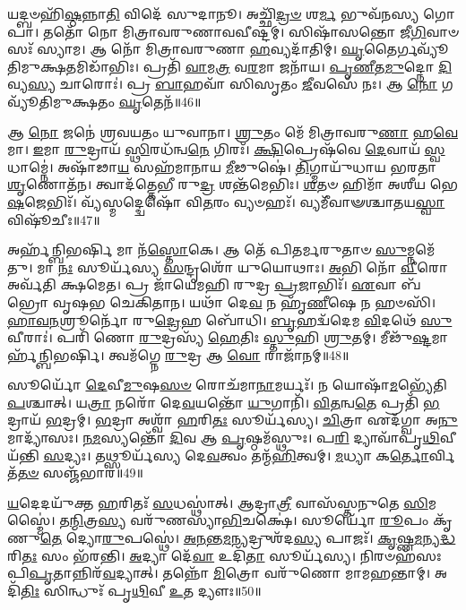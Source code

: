 𑌯𑌦𑍍𑌬𑍞𑌹𑌿᳴\-\ul{𑌷𑍍𑌠}\-𑌨𑍍𑌨𑌾\-\ul{𑌤𑌿} 𑌵𑌿𑌦𑍇᳴ 𑌸𑍁𑌦𑌾𑌨𑍂।
𑌅𑌚𑍍𑌛𑌿᳴\-\ul{𑌦𑍍𑌰}\-\-\ul{𑍞} 𑌶\-\ul{𑌰𑍍𑌮} 𑌭𑍁𑌵᳴𑌨𑌸𑍍𑌯 𑌗𑍋𑌪𑌾।
𑌤𑌤𑍋᳴ 𑌨𑍋 𑌮𑌿𑌤𑍍𑌰𑌾𑌵𑌰𑍁𑌣𑌾𑌵𑌵𑍀𑌷𑍍𑌟𑌮𑍍।
𑌸𑌿𑌷𑌾᳴𑌸𑌨𑍍𑌤𑍋 𑌜𑍀\-\ul{𑌗𑌿}\-𑌵𑌾𑍞𑌸𑌃᳴ 𑌸𑍍𑌯𑌾𑌮।
𑌆 𑌨𑍋᳴ 𑌮𑌿𑌤𑍍𑌰𑌾𑌵𑌰𑍁𑌣𑌾 \ul{𑌹}\-𑌵𑍍𑌯𑌦𑌾᳴𑌤𑌿𑌮𑍍।
\-\ul{𑌘𑍃}\-𑌤𑍈𑌰𑍍𑌗𑌵𑍍𑌯𑍂᳴𑌤𑌿𑌮𑍁𑌕𑍍𑌷\-\ul{𑌤}\-𑌮𑌿𑌡𑌾᳴𑌭𑌿𑌃।
𑌪𑍍𑌰𑌤𑌿᳴ \ul{𑌵𑌾}\-𑌮\-\ul{𑌤𑍍𑌰} 𑌵\-\ul{𑌰}\-𑌮𑌾 𑌜𑌨𑌾᳴𑌯।
\-\ul{𑌪𑍃}\-\-\ul{𑌣𑍀}\-𑌤\-\ul{𑌮𑍁}\-𑌦𑍍𑌨𑍋 \ul{𑌦𑌿}\-𑌵𑍍𑌯\-\ul{𑌸𑍍𑌯} 𑌚𑌾𑌰𑍋𑌃॑।
𑌪𑍍𑌰 \ul{𑌬𑌾}\-𑌹𑌵𑌾᳴ 𑌸𑌿𑌸𑍃𑌤𑌂 \ul{𑌜𑍀}\-𑌵𑌸𑍇᳴ 𑌨𑌃।
𑌆 \ul{𑌨𑍋} 𑌗𑌵𑍍𑌯𑍂᳴𑌤𑌿𑌮𑍁𑌕𑍍𑌷𑌤𑌂 \ul{𑌘𑍃}\-𑌤𑍇𑌨᳴॥46॥

𑌆 \ul{𑌨𑍋} 𑌜𑌨𑍇॑ 𑌶𑍍𑌰𑌵𑌯𑌤𑌂 𑌯𑍁𑌵𑌾𑌨𑌾।
\-\ul{𑌶𑍍𑌰𑍁}\-𑌤𑌂 𑌮𑍇᳴ 𑌮𑌿𑌤𑍍𑌰𑌾𑌵𑌰𑍁\-\ul{𑌣𑌾} 𑌹\-\ul{𑌵𑍇}\-𑌮𑌾।
\-\ul{𑌇}\-𑌮𑌾 \ul{𑌰𑍁}\-𑌦𑍍𑌰𑌾𑌯᳴ \ul{𑌸𑍍𑌥𑌿}\-𑌰𑌧᳴𑌨𑍍𑌵\-\ul{𑌨𑍇} 𑌗𑌿𑌰𑌃᳴।
\-\ul{𑌕𑍍𑌷𑌿}\-𑌪𑍍𑌰𑍇𑌷᳴𑌵𑍇 \ul{𑌦𑍇}\-𑌵𑌾𑌯᳴ \ul{𑌸𑍍𑌵}\-𑌧𑌾𑌮𑍍𑌨𑍇॑।
𑌅𑌷𑌾᳴𑌢𑌾\-\ul{𑌯} 𑌸𑌹᳴𑌮𑌾𑌨𑌾𑌯 \ul{𑌮𑍀}\-𑌢𑍁𑌷𑍇॑।
\-\ul{𑌤𑌿}\-𑌗𑍍𑌮𑌾𑌯𑍁᳴𑌧𑌾𑌯 𑌭𑌰𑌤𑌾 \ul{𑌶𑍃}\-𑌣𑍋𑌤᳴𑌨।
𑌤𑍍𑌵𑌾𑌦᳴𑌤𑍍𑌤𑍇𑌭𑍀 𑌰𑍁\-\ul{𑌦𑍍𑌰} 𑌶𑌨𑍍𑌤᳴𑌮𑍇𑌭𑌿𑌃।
\-\ul{𑌶}\-𑌤𑍞 𑌹𑌿𑌮𑌾᳴ 𑌅𑌶𑍀𑌯 𑌭𑍇\-\ul{𑌷}\-𑌜𑍇𑌭𑌿𑌃᳴।
𑌵𑍍𑌯᳴𑌸𑍍𑌮𑌦𑍍𑌦𑍍𑌵𑍇𑌷𑍋᳴ 𑌵𑌿\-\ul{𑌤}\-𑌰𑌂 𑌵𑍍𑌯𑍞𑌹𑌃᳴।
𑌵𑍍𑌯𑌮𑍀᳴𑌵𑌾𑍟𑌶𑍍𑌚𑌾𑌤𑌯\-\ul{𑌸𑍍𑌵𑌾} 𑌵𑌿𑌷𑍂᳴𑌚𑍀𑌃॥47॥

𑌅𑌰𑍍\mbox{}𑌹᳴𑌨𑍍𑌬𑌿𑌭𑌰𑍍\mbox{}\-\ul{𑌷𑌿} 𑌮𑌾 𑌨᳴\-\ul{𑌸𑍍𑌤𑍋}\-𑌕𑍇।
𑌆 𑌤𑍇᳴ 𑌪𑌿𑌤𑌰𑍍𑌮𑌰𑍁𑌤𑌾𑍞 \ul{𑌸𑍁}\-𑌮𑍍𑌨𑌮𑍇᳴𑌤𑍁।
𑌮𑌾 \ul{𑌨𑌃} 𑌸𑍂𑌰𑍍𑌯᳴𑌸𑍍𑌯 \ul{𑌸}\-𑌨𑍍𑌦𑍃𑌶𑍋᳴ 𑌯𑍁𑌯𑍋𑌥𑌾𑌃।
\-\ul{𑌅}\-𑌭𑌿 𑌨𑍋᳴ \ul{𑌵𑍀}\-𑌰𑍋 𑌅𑌰𑍍𑌵᳴𑌤𑌿 𑌕𑍍𑌷𑌮𑍇𑌤।
𑌪𑍍𑌰 𑌜𑌾᳴𑌯𑍇𑌮𑌹𑌿 𑌰𑍁𑌦𑍍𑌰 \ul{𑌪𑍍𑌰}\-𑌜𑌾𑌭𑌿𑌃᳴।
\-\ul{𑌏}\-𑌵𑌾 𑌬᳴𑌭𑍍𑌰𑍋 𑌵𑍃𑌷𑌭 𑌚𑍇𑌕𑌿𑌤𑌾𑌨।
𑌯𑌥𑌾᳴ 𑌦𑍇\-\ul{𑌵} 𑌨 𑌹𑍃᳴\-\ul{𑌣𑍀}\-𑌷𑍇 𑌨 𑌹𑍞𑌸𑌿᳴।
\-\ul{𑌹𑌾}\-\-\ul{𑌵}\-\-\ul{𑌨}\-𑌶𑍍𑌰𑍂𑌰𑍍𑌨𑍋᳴ 𑌰𑍁\-\ul{𑌦𑍍𑌰𑍇}\-𑌹 𑌬𑍋᳴𑌧𑌿।
\-\ul{𑌬𑍃}\-𑌹𑌦𑍍𑌵᳴𑌦𑍇𑌮 \ul{𑌵𑌿}\-𑌦𑌥𑍇᳴ \ul{𑌸𑍁}\-𑌵𑍀𑌰𑌾𑌃॑।
𑌪𑌰𑌿᳴ 𑌣𑍋 \ul{𑌰𑍁}\-𑌦𑍍𑌰𑌸𑍍𑌯᳴ \ul{𑌹𑍇}\-𑌤𑌿𑌃 \ul{𑌸𑍍𑌤𑍁}\-𑌹𑌿 \ul{𑌶𑍍𑌰𑍁}\-𑌤𑌮𑍍।
𑌮𑍀𑌢𑍁᳴\-\ul{𑌷𑍍𑌟}\-𑌮𑌾𑌰𑍍\mbox{}𑌹᳴𑌨𑍍𑌬𑌿𑌭𑌰𑍍\mbox{}𑌷𑌿।
𑌤𑍍𑌵𑌮᳴𑌗𑍍𑌨𑍇 \ul{𑌰𑍁}\-𑌦𑍍𑌰 𑌆 \ul{𑌵𑍋} 𑌰𑌾𑌜𑌾᳴𑌨𑌮𑍍॥48॥\anuvakamend[𑌵𑌸𑍂᳴𑌨𑌿 𑌤𑌤𑌾𑌨𑌾\-\ul{𑌸𑍍𑌤𑍁} 𑌵𑌿𑌶𑍍𑌵𑌾𑌨𑍍᳴ 𑌵𑌵𑍃𑌤𑍍𑌯𑌾𑌂 𑌵𑌵𑌰𑍍𑌤𑌿 \ul{𑌘𑍃}\-𑌤𑍇\-\ul{𑌨} 𑌵𑌿𑌷𑍂᳴𑌚𑍀𑌃 \ul{𑌶𑍍𑌰𑍁}\-𑌤𑌨𑍍𑌦𑍍𑌵𑍇 𑌚᳴]

𑌸𑍂𑌰𑍍𑌯𑍋᳴ \ul{𑌦𑍇}\-𑌵𑍀\-\ul{𑌮𑍁}\-𑌷\-\ul{𑌸}\-\-\ul{𑍞} 𑌰𑍋𑌚᳴𑌮𑌾\-\ul{𑌨𑌾}\-𑌮𑌰𑍍𑌯𑌃᳴।
𑌨 𑌯𑍋𑌷𑌾᳴\-\ul{𑌮}\-𑌭𑍍𑌯𑍇᳴𑌤𑌿 \ul{𑌪}\-𑌶𑍍𑌚𑌾𑌤𑍍।
𑌯\-\ul{𑌤𑍍𑌰𑌾} 𑌨𑌰𑍋᳴ 𑌦𑍇\-\ul{𑌵}\-𑌯𑌨𑍍𑌤𑍋᳴ \ul{𑌯𑍁}\-𑌗𑌾𑌨𑌿᳴।
\-\ul{𑌵𑌿}\-\-\ul{𑌤}\-𑌨𑍍𑌵\-\ul{𑌤𑍇} 𑌪𑍍𑌰𑌤𑌿᳴ \ul{𑌭}\-𑌦𑍍𑌰𑌾𑌯᳴ \ul{𑌭}\-𑌦𑍍𑌰𑌮𑍍।
\-\ul{𑌭}\-𑌦𑍍𑌰𑌾 𑌅𑌶𑍍𑌵𑌾᳴ \ul{𑌹}\-𑌰𑌿\-\ul{𑌤𑌃} 𑌸𑍂𑌰𑍍𑌯᳴𑌸𑍍𑌯।
\-\ul{𑌚𑌿}\-𑌤𑍍𑌰𑌾 𑌏𑌦᳴𑌗𑍍𑌵𑌾 𑌅\-\ul{𑌨𑍁}\-𑌮𑌾𑌦𑍍𑌯𑌾᳴𑌸𑌃।
\-\ul{𑌨}\-\-\ul{𑌮}\-𑌸𑍍𑌯𑌨𑍍𑌤𑍋᳴ \ul{𑌦𑌿}\-𑌵 𑌆 \ul{𑌪𑍃}\-𑌷𑍍𑌠𑌮᳴𑌸𑍍𑌥𑍁𑌃।
𑌪\-\ul{𑌰𑌿} 𑌦𑍍𑌯𑌾𑌵𑌾᳴𑌪𑍃\-\ul{𑌥𑌿}\-𑌵𑍀 𑌯᳴𑌨𑍍𑌤𑌿 \ul{𑌸}\-𑌦𑍍𑌯𑌃।
𑌤𑌥𑍍𑌸𑍂𑌰𑍍𑌯᳴𑌸𑍍𑌯 𑌦𑍇\-\ul{𑌵}\-𑌤𑍍𑌵𑌂 𑌤𑌨𑍍𑌮᳴\-\ul{𑌹𑌿}\-𑌤𑍍𑌵𑌮𑍍।
\-\ul{𑌮}\-𑌧𑍍𑌯𑌾 𑌕\-\ul{𑌰𑍍𑌤𑍋}\-𑌰𑍍𑌵𑌿𑌤᳴\-\ul{𑌤}\-\-\ul{𑍞} 𑌸𑌞𑍍𑌜᳴𑌭𑌾𑌰॥49॥

\-\ul{𑌯}\-𑌦𑍇𑌦𑌯𑍁᳴𑌕𑍍𑌤 \ul{𑌹}\-𑌰𑌿𑌤𑌃᳴ \ul{𑌸}\-𑌧𑌸𑍍𑌥𑌾॑𑌤𑍍।
𑌆𑌦𑍍𑌰𑌾\-\ul{𑌤𑍍𑌰𑍀} 𑌵𑌾𑌸᳴𑌸𑍍𑌤𑌨𑍁𑌤𑍇 \ul{𑌸𑌿}\-𑌮𑌸𑍍𑌮𑍈॑।
𑌤\-\ul{𑌨𑍍𑌮𑌿}\-𑌤𑍍𑌰\-\ul{𑌸𑍍𑌯} 𑌵𑌰𑍁᳴𑌣𑌸𑍍𑌯𑌾\-\ul{𑌭𑌿}\-𑌚𑌕𑍍𑌷𑍇॑।
𑌸𑍂𑌰𑍍𑌯𑍋᳴ \ul{𑌰𑍂}\-𑌪𑌂 𑌕𑍃᳴𑌣𑍁\-\ul{𑌤𑍇} 𑌦𑍍𑌯𑍋\-\ul{𑌰𑍁}\-𑌪𑌸𑍍𑌥𑍇॑।
\-\ul{𑌅}\-\-\ul{𑌨}\-𑌨𑍍𑌤\-\ul{𑌮}\-𑌨𑍍𑌯𑌦𑍍𑌰𑍁𑌶᳴𑌦\-\ul{𑌸𑍍𑌯} 𑌪𑌾𑌜𑌃᳴।
\-\ul{𑌕𑍃}\-𑌷𑍍𑌣\-\ul{𑌮}\-𑌨𑍍𑌯\-\ul{𑌦𑍍𑌧}\-𑌰𑌿\-\ul{𑌤𑌃} 𑌸𑌂 𑌭᳴𑌰𑌨𑍍𑌤𑌿।
\-\ul{𑌅}\-𑌦𑍍𑌯𑌾 𑌦𑍇᳴\-\ul{𑌵𑌾} 𑌉𑌦𑌿᳴\-\ul{𑌤𑌾} 𑌸𑍂𑌰𑍍𑌯᳴𑌸𑍍𑌯।
𑌨𑌿𑌰𑍞𑌹᳴𑌸𑌃 𑌪𑌿\-\ul{𑌪𑍃}\-𑌤𑌾𑌨𑍍𑌨𑌿𑌰᳴\-\ul{𑌵}\-𑌦𑍍𑌯𑌾𑌤𑍍।
𑌤𑌨𑍍𑌨𑍋᳴ \ul{𑌮𑌿}\-𑌤𑍍𑌰𑍋 𑌵𑌰𑍁᳴𑌣𑍋 𑌮𑌾𑌮𑌹𑌨𑍍𑌤𑌾𑌮𑍍।
𑌅𑌦𑌿᳴\-\ul{𑌤𑌿𑌃} 𑌸𑌿𑌨𑍍𑌧𑍁𑌃᳴ 𑌪𑍃\-\ul{𑌥𑌿}\-𑌵𑍀 \ul{𑌉}\-𑌤 𑌦𑍍𑌯𑍗𑌃॥50॥

